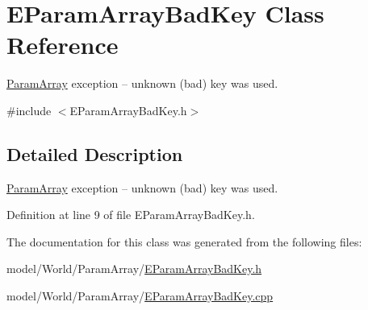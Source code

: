 \hypertarget{classEParamArrayBadKey}{\section{E\-Param\-Array\-Bad\-Key Class Reference}
\label{classEParamArrayBadKey}
}


\hyperlink{classParamArray}{Param\-Array} exception -- unknown (bad) key was used.  




{\ttfamily \#include $<$E\-Param\-Array\-Bad\-Key.\-h$>$}



\subsection{Detailed Description}
\hyperlink{classParamArray}{Param\-Array} exception -- unknown (bad) key was used. 

Definition at line 9 of file E\-Param\-Array\-Bad\-Key.\-h.



The documentation for this class was generated from the following files\-:\begin{DoxyCompactItemize}
\item 
model/\-World/\-Param\-Array/\hyperlink{EParamArrayBadKey_8h}{E\-Param\-Array\-Bad\-Key.\-h}\item 
model/\-World/\-Param\-Array/\hyperlink{EParamArrayBadKey_8cpp}{E\-Param\-Array\-Bad\-Key.\-cpp}\end{DoxyCompactItemize}
